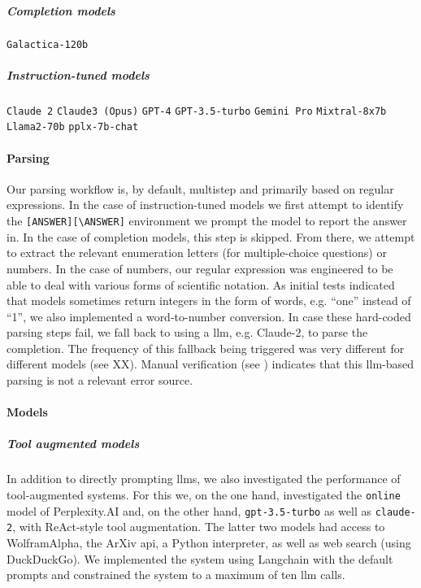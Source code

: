 \documentclass[11pt, oneside]{article}
\begin{document}
\subparagraph{Completion models}
\texttt{Galactica-120b}\cite{taylor2022galactica}


\subparagraph{Instruction-tuned models} \texttt{Claude 2} \texttt{Claude3 (Opus)}\cite{anthropicClaudeModelFamily2024}
\texttt{GPT-4}\cite{openai2024gpt4}
\texttt{GPT-3.5-turbo}\cite{brown2020language}
\texttt{Gemini Pro}\cite{gemini}
\texttt{Mixtral-8x7b}\cite{jiang2024mixtral}
\texttt{Llama2-70b}\cite{touvron2023llama}
\texttt{pplx-7b-chat}

\paragraph{Parsing}
Our parsing workflow is, by default, multistep and primarily based on regular expressions.
In the case of instruction-tuned models we first attempt to identify the \texttt{[ANSWER][\textbackslash ANSWER]} environment we prompt the model to report the answer in.
In the case of completion models, this step is skipped. From there, we attempt to extract the relevant enumeration letters (for multiple-choice questions) or numbers.
In the case of numbers, our regular expression was engineered to be able to deal with various forms of scientific notation.
As initial tests indicated that models sometimes return integers in the form of words, e.g. \enquote{one} instead of \enquote{1}, we also implemented a word-to-number conversion.
In case these hard-coded parsing steps fail, we fall back to using a \gls{llm}, e.g. Claude-2, to parse the completion.
The frequency of this fallback being triggered was very different for different models (see XX).
Manual verification (see ) indicates that this \gls{llm}-based parsing is not a relevant error source.

\paragraph{Models}


\subparagraph{Tool augmented models}
In addition to directly prompting \glspl{llm}, we also investigated the performance of tool-augmented systems.
For this we, on the one hand, investigated the \texttt{online} model of Perplexity.AI and, on the other hand, \texttt{gpt-3.5-turbo} as well as \texttt{claude-2}, with ReAct-style tool augmentation.\cite{yao2023react}
The latter two models had access to WolframAlpha, the ArXiv \gls{api}, a Python interpreter, as well as web search (using DuckDuckGo).
We implemented the system using Langchain with the default prompts and constrained the system to a maximum of ten \gls{llm} calls.
\end{document}
